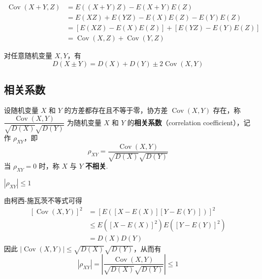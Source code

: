 \begin{myproof}
    $$
    \begin{aligned}
        \operatorname{Cov}(X+Y,Z) &= E((X+Y)Z) - E(X+Y) E(Z) \\
        &= E(XZ) + E(YZ) - E(X) E(Z) - E(Y) E(Z) \\
        &= [E(XZ) - E(X) E(Z)] + [E(YZ) - E(Y) E(Z)] \\
        &= \operatorname{Cov}(X,Z) + \operatorname{Cov}(Y,Z)
    \end{aligned}
    $$
\end{myproof}

\begin{property}
    对任意随机变量 $X,Y$，有
    $$
    D(X \pm Y) = D(X) + D(Y) \pm 2 \operatorname{Cov}(X,Y)
    $$
\end{property}

\subsection{相关系数}

\begin{definition}
    设随机变量 $X$ 和 $Y$ 的方差都存在且不等于零，协方差 $\operatorname{Cov}(X,Y)$ 存在，称 $\dfrac{\operatorname{Cov}(X,Y)}{\sqrt{D(X)} \sqrt{D(Y)}}$ 为随机变量 $X$ 和 $Y$ 的\textbf{相关系数}（correlation coefficient），记作 $\rho_{XY}$，即
    $$
    \rho_{XY} = \dfrac{\operatorname{Cov}(X,Y)}{\sqrt{D(X)} \sqrt{D(Y)}}
    $$
    当 $\rho_{XY} = 0$ 时，称 $X$ 与 $Y$ \textbf{不相关}.
\end{definition}

\setcounter{propertyname}{0}

\begin{property}
    $|\rho_{XY}| \leqslant 1$
\end{property}

\begin{myproof}
    由柯西-施瓦茨不等式可得
    $$
    \begin{aligned}
        \left[ \operatorname{Cov}(X,Y) \right]^2 &= [E([X-E(X)][Y-E(Y)])]^2 \\
        & \leqslant E([X-E(X)]^2) E([Y-E(Y)]^2) \\
        &= D(X) D(Y)
    \end{aligned}
    $$
    因此 $|\operatorname{Cov}(X,Y)| \leqslant \sqrt{D(X)} \sqrt{D(Y)}$，从而有
    $$
    |\rho_{XY}| = \left| \dfrac{\operatorname{Cov}(X,Y)}{\sqrt{D(X)} \sqrt{D(Y)}} \right| \leqslant 1
    $$
\end{myproof}

